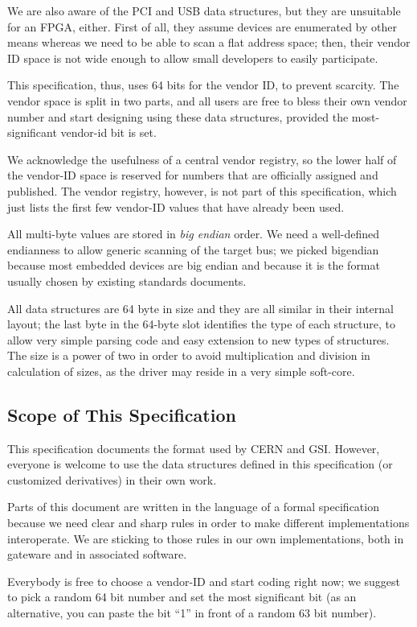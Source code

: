 \documentclass[a4paper, 12pt]{article}
\begin{document}
We are also aware of the PCI and USB data structures, but they are
unsuitable for an FPGA, either. First of all, they assume devices are
enumerated by other means whereas we need to be able to scan a flat
address space; then, their vendor ID space is not wide enough to allow
small developers to easily participate.

This specification, thus, uses 64 bits for the vendor ID, to prevent scarcity.
The vendor space is split in two parts, and all users are free to bless their
own vendor number and start designing using these data structures,
provided the most-significant vendor-id bit is set.

We acknowledge the usefulness of a central vendor registry, so
the lower half of the
vendor-ID space is reserved for numbers that
are officially assigned and published.  The vendor registry, however, is not
part of this specification, which just lists the first few vendor-ID values that
have already been used.

All multi-byte values are stored in \textit{big endian} order.  We need
a well-defined endianness to allow generic scanning of the target bus;
we picked bigendian because most embedded devices are big endian and
because  it is the format usually chosen by existing standards documents.

All data structures are 64 byte in size and they are all similar in their
internal layout; the last byte in the 64-byte slot identifies the type
of each structure, to allow very simple parsing code and easy extension
to new types of structures.  The size is a power of two in order to
avoid multiplication and division in calculation of sizes, as the
driver may reside in a very simple soft-core.


\subsection{Scope of This Specification}

This specification documents the format used by CERN and GSI. However,
everyone is welcome to use the data structures defined in this
specification (or customized derivatives) in their own work.

Parts of this document are written in the language of
a formal specification because we need clear and sharp rules in
order to make different implementations interoperate.  We are sticking
to those rules in our own implementations, both in gateware and in
associated software.

Everybody is free to choose a vendor-ID and start coding right now; we
suggest to pick a random 64 bit number and set the most significant
bit (as an alternative, you can paste the bit ``1'' in front of
a random 63 bit number).
\end{document}
